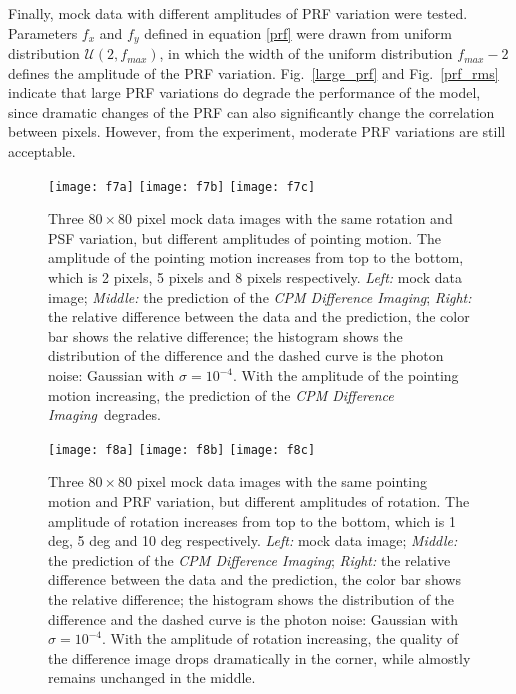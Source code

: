 \documentclass[12pt, preprint]{aastex}
\newcommand{\project}[1]{\textsl{#1}}
\newcommand{\cpmdiff}{\project{CPM Difference Imaging}}
\begin{document}
Finally, mock data with different amplitudes of PRF variation were tested.
Parameters $f_x$ and $f_y$ defined in equation \ref{prf} were drawn from uniform distribution ${\mathcal {U}}(2,f_{max})$, in which the width of the uniform distribution $f_{max}-2$ defines the amplitude of the PRF variation.
Fig.~\ref{large_prf} and Fig.~\ref{prf_rms} indicate that large PRF variations do degrade the performance of the model, since dramatic changes of the PRF can also significantly change the correlation between pixels.
However, from the experiment, moderate PRF variations are still acceptable. 

\begin{figure}[p]
\begin{center}
\texttt{[image: f7a]}
\texttt{[image: f7b]}
\texttt{[image: f7c]}
\end{center}
\caption{
  \label{large_motion}
  Three $80\times 80$ pixel mock data images with the same rotation and PSF variation, but different amplitudes of pointing motion. The amplitude of the pointing motion increases from top to the bottom, which is 2 pixels, 5 pixels and 8 pixels respectively. 
  \emph{Left:} mock data image;
  \emph{Middle:} the prediction of the \cpmdiff;
  \emph{Right:} the relative difference between the data and the prediction, the color bar shows the relative difference; the histogram shows the distribution of the difference and the dashed curve is the photon noise: Gaussian with $\sigma = 10^{-4}$. 
  With the amplitude of the pointing motion increasing, the prediction of the \cpmdiff\ degrades.
}
\end{figure}

\begin{figure}[p]
\begin{center}
\texttt{[image: f8a]}
\texttt{[image: f8b]}
\texttt{[image: f8c]}
\end{center}
\caption{
  \label{large_rotation}
  Three $80\times 80$ pixel mock data images with the same pointing motion and PRF variation, but different amplitudes of rotation. The amplitude of rotation increases from top to the bottom, which is 1 deg, 5 deg and 10 deg respectively.
  \emph{Left:} mock data image;
  \emph{Middle:} the prediction of the \cpmdiff;
  \emph{Right:} the relative difference between the data and the prediction, the color bar shows the relative difference; the histogram shows the distribution of the difference and the dashed curve is the photon noise: Gaussian with $\sigma = 10^{-4}$. 
  With the amplitude of rotation increasing, the quality of the difference image drops dramatically in the corner, while almostly remains unchanged in the middle.
}
\end{figure}
\end{document}
